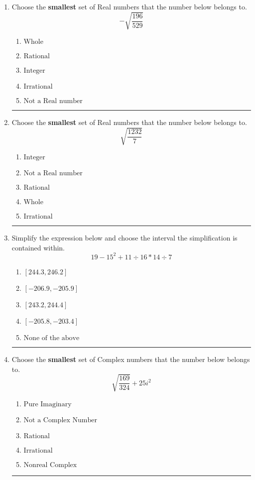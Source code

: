 \documentclass[14pt]{extbook}
\newcommand{\litem}[1]{\item#1\hspace*{-1cm}\rule{\textwidth}{0.4pt}}
\begin{document}
\begin{enumerate}
{\begin{enumerate}[label=\Alph*.]
\end{enumerate} }
\litem{
Choose the \textbf{smallest} set of Real numbers that the number below belongs to.\[ -\sqrt{\frac{196}{529}} \]\begin{enumerate}[label=\Alph*.]
\item \( \text{Whole} \)
\item \( \text{Rational} \)
\item \( \text{Integer} \)
\item \( \text{Irrational} \)
\item \( \text{Not a Real number} \)

\end{enumerate} }
\litem{
Choose the \textbf{smallest} set of Real numbers that the number below belongs to.\[ \sqrt{\frac{1232}{7}} \]\begin{enumerate}[label=\Alph*.]
\item \( \text{Integer} \)
\item \( \text{Not a Real number} \)
\item \( \text{Rational} \)
\item \( \text{Whole} \)
\item \( \text{Irrational} \)

\end{enumerate} }
\litem{
Simplify the expression below and choose the interval the simplification is contained within.\[ 19 - 15^2 + 11 \div 16 * 14 \div 7 \]\begin{enumerate}[label=\Alph*.]
\item \( [244.3, 246.2] \)
\item \( [-206.9, -205.9] \)
\item \( [243.2, 244.4] \)
\item \( [-205.8, -203.4] \)
\item \( \text{None of the above} \)

\end{enumerate} }
\litem{
Choose the \textbf{smallest} set of Complex numbers that the number below belongs to.\[ \sqrt{\frac{169}{324}} + 25i^2 \]\begin{enumerate}[label=\Alph*.]
\item \( \text{Pure Imaginary} \)
\item \( \text{Not a Complex Number} \)
\item \( \text{Rational} \)
\item \( \text{Irrational} \)
\item \( \text{Nonreal Complex} \)


\end{enumerate}}
\end{enumerate}
\end{document}
